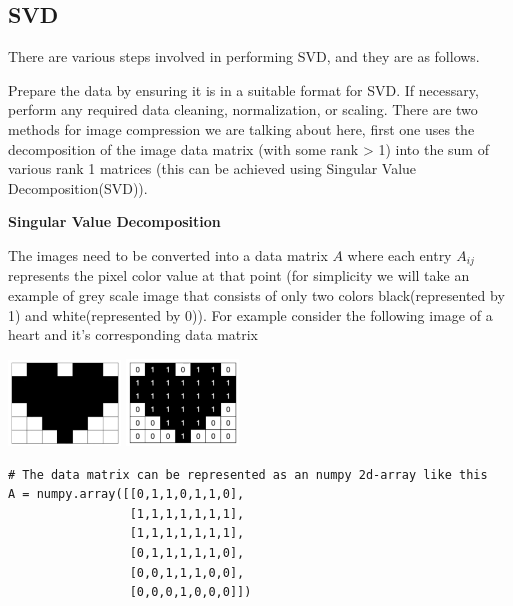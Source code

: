 \documentclass{article}
\begin{document}
\subsection{SVD}

There are various steps involved in performing SVD, and they are as follows.

Prepare the data by ensuring it is in a suitable format for SVD. If necessary, perform any required data cleaning, normalization, or scaling. There are two methods for image compression we are talking about here, first one uses the decomposition of the image data matrix (with some rank \textgreater{} 1) into the sum of various rank 1 matrices (this can be achieved using Singular Value Decomposition(SVD)).\\

\begin{center}
  \large\textbf{Singular Value Decomposition}
\end{center}

The images need to be converted into a data matrix $A$ where each entry $A_{ij}$ represents the pixel color value at that point (for simplicity we will take an example of grey scale image that consists of only two colors black(represented by 1) and white(represented by 0)). For example consider the following image of a heart and it's corresponding data matrix\\

\begin{center}
    \includegraphics[width=3cm]{heart.png} \hspace{2cm}
    \includegraphics[width=3cm]{pixel-value-heart.png}
\end{center}

\begin{verbatim}
# The data matrix can be represented as an numpy 2d-array like this
A = numpy.array([[0,1,1,0,1,1,0],
                 [1,1,1,1,1,1,1],
                 [1,1,1,1,1,1,1],
                 [0,1,1,1,1,1,0],
                 [0,0,1,1,1,0,0],
                 [0,0,0,1,0,0,0]])
\end{verbatim}
\end{document}
